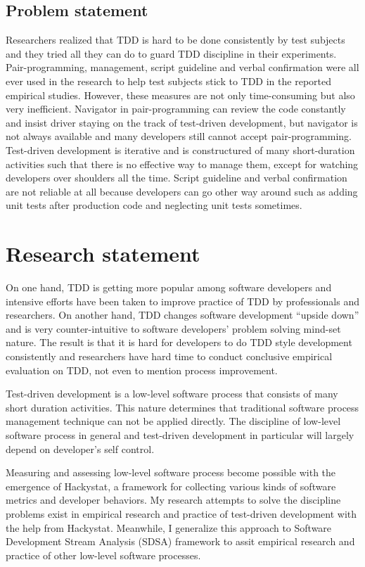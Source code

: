 \subsection{Problem statement}
Researchers realized that TDD is hard to be done consistently by test
subjects and they tried all they can do to guard TDD discipline in their
experiments. Pair-programming, management, script guideline and verbal
confirmation were all ever used in the research to help test subjects stick
to TDD in the reported empirical studies. However, these measures are not
only time-consuming but also very inefficient. Navigator in
pair-programming can review the code constantly and insist driver staying
on the track of test-driven development, but navigator is not always
available and many developers still cannot accept pair-programming.
Test-driven development is iterative and is constructured of many
short-duration activities such that there is no effective way to manage
them, except for watching developers over shoulders all the time.  Script
guideline and verbal confirmation are not reliable at all because
developers can go other way around such as adding unit tests after
production code and neglecting unit tests sometimes.

\section{Research statement}
On one hand, TDD is getting more popular among software developers and
intensive efforts have been taken to improve practice of TDD by
professionals and researchers\cite{Beck:03,TestDrivenWeb,TddYahooGroup}. On
another hand, TDD changes software development ``upside down''
\cite{Pipka:03} and is very counter-intuitive to software developers'
problem solving mind-set nature. The result is that it is hard for
developers to do TDD style development consistently and researchers have
hard time to conduct conclusive empirical evaluation on TDD, not even to
mention process improvement.

Test-driven development is a low-level software process that consists of
many short duration activities. This nature determines that traditional
software process management technique can not be applied directly.  The
discipline of low-level software process in general and test-driven
development in particular will largely depend on developer's self control.

Measuring and assessing low-level software process become possible with the
emergence of Hackystat\cite{Hackystat}, a framework for collecting various
kinds of software metrics and developer behaviors. My research attempts to
solve the discipline problems exist in empirical research and practice of
test-driven development with the help from Hackystat. Meanwhile, I
generalize this approach to Software Development Stream Analysis (SDSA)
framework to assit empirical research and practice of other low-level
software processes.

